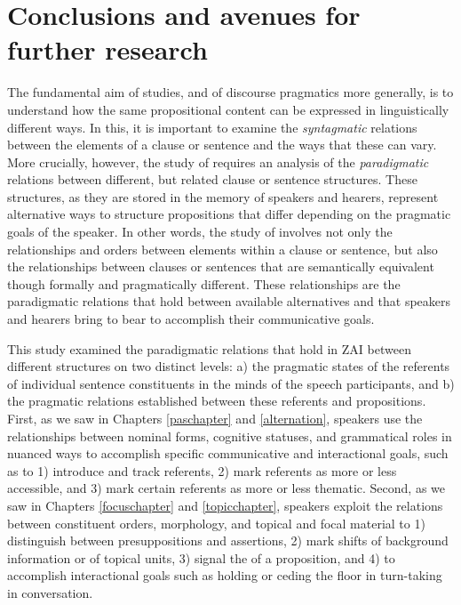 
\chapter{Conclusions and avenues for further research}


The fundamental aim of  studies, and of discourse pragmatics more generally, is to understand how the same propositional content can be expressed in linguistically different ways. In this, it is important to examine the \textit{syntagmatic} relations between the elements of a clause or sentence and the ways that these can vary. More crucially, however, the study of  requires an analysis of the \textit{paradigmatic} relations between different, but related clause or sentence structures. These structures, as they are stored in the memory of speakers and hearers, represent alternative ways to structure propositions that differ depending on the pragmatic goals of the speaker. In other words, the study of  involves not only the relationships and orders between elements within a clause or sentence, but also the relationships between clauses or sentences that are semantically equivalent though formally and pragmatically different. These relationships are the paradigmatic relations that hold between available alternatives and that speakers and hearers bring to bear to accomplish their communicative goals. 

This study examined the paradigmatic relations that hold in ZAI between different structures on two distinct levels: a) the pragmatic states of the referents of individual sentence constituents in the minds of the speech participants, and b) the pragmatic relations established between these referents and propositions. First, as we saw in Chapters \ref{paschapter} and \ref{alternation}, speakers use the relationships between nominal forms, cognitive statuses, and grammatical roles in nuanced ways to accomplish specific communicative and interactional goals, such as to 1) introduce and track referents, 2) mark referents as more or less accessible, and 3) mark certain referents as more or less thematic. Second, as we saw in Chapters \ref{focuschapter} and \ref{topicchapter}, speakers exploit the relations between constituent orders, morphology, and topical and focal material to 1) distinguish between presuppositions and assertions, 2) mark shifts of background information or of topical units, 3) signal the  of a proposition, and 4) to accomplish interactional goals such as holding or ceding the floor in turn-taking in conversation.

